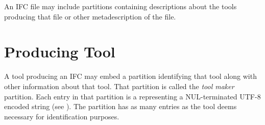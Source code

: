 \label{sec:ifc-meta}

An IFC file may include partitions containing descriptions about the tools producing that file or other metadescription of the file.


\section{Producing Tool}
\label{sec:ifc-tool-maker}

A tool producing an IFC may embed a partition identifying that tool along with other information about that tool. 
That partition is called the \emph{tool maker} partition.
Each entry in that partition is a  representing a NUL-terminated UTF-8 encoded string (see ).  
The partition has as many entries as the tool deems necessary for identification purposes.

